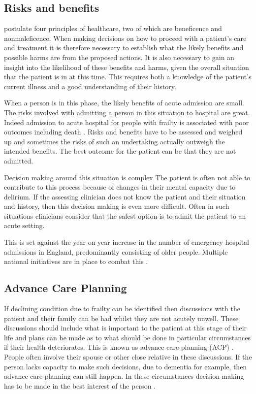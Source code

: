 \documentclass
[
	12pt,
	a4paper,
	oneside,
]{report}
\begin{document}
\subsection{Risks and benefits}
\label{sec:risk-ben}

\textcite{beauchampChildress:01} postulate four principles of healthcare, two
of which are beneficence and nonmaleficence.
When making decisions on how to proceed with a patient's care and treatment
it is therefore necessary to establish what the likely benefits and possible 
harms are from the proposed actions. It is also necessary to gain an insight 
into the likelihood of these benefits and harms, given the overall situation that
the patient is in at this time. This requires both a knowledge of the patient's 
current illness and a good understanding of their history.

When a person is in this phase, the likely benefits of acute admission are small.
The risks involved with admitting a person in this situation
to hospital are great.  
Indeed admission to acute hospital for people with frailty is associated with
poor outcomes including death \parencite{silver:12, wallis:15}. Risks and 
benefits have to be assessed and 
weighed up and sometimes the risks of such an undertaking actually
outweigh the intended benefits. The best outcome for the patient can be that 
they are not admitted. 

Decision making around this situation is complex 
The patient is often not able to contribute to this process because of changes 
in their
mental capacity due to delirium. If the assessing clinician does not know the 
patient and their situation and history, then this decision making is even more 
difficult. Often in such situations clinicians consider that the safest option is to 
admit the patient to an acute setting.

This is set against the year on year increase in the number of emergency hospital 
admissions in England, predominantly consisting of older people. Multiple 
national initiatives are in place to combat this \parencite{nao:18}.

\subsection{Advance Care Planning}

If declining condition due to frailty can be identified then discussions with the 
patient and their family can be had whilst they are not acutely unwell. These 
discussions should include what is important to the patient at this stage of their
life and plans can be made as to what should be done in particular circumstances
if their health deteriorates. This is known as advance care planning
(ACP) \parencite{jennings:18}. People often involve their spouse or other close 
relative in these discussions. If the person lacks capacity to make such
decisions, due to dementia for example, then advance care planning can still
happen. In these circumstances decision making has to be made in the best
interest of the person \parencite{ncpc:11}.
\end{document}
